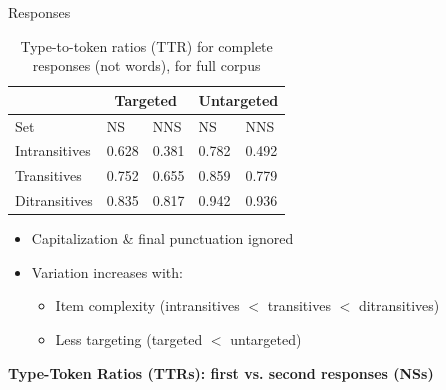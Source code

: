 \documentclass[final,t]{beamer}
\begin{document}
\begin{frame}{}
\begin{columns}[t]
\begin{column}{.33\linewidth}
\begin{block}{Responses}
\begin{center}
\begin{minipage}{.85\textwidth}
\begin{table}[h!]
\begin{center}
\begin{tabular}{|l||l|l||l|l|}
\hline
 & \multicolumn{2}{|c||}{Targeted} & \multicolumn{2}{|c|}{Untargeted} \\
\hline
 Set & NS & NNS & NS & NNS \\
\hline
\hline
Intransitives & 0.628 & 0.381 & 0.782 & 0.492 \\
\hline
Transitives & 0.752 & 0.655 & 0.859 & 0.779 \\
\hline
Ditransitives & 0.835 & 0.817 & 0.942 & 0.936 \\ 
\hline
\end{tabular}
\caption{\label{tab:ttr} Type-to-token ratios (TTR) for complete responses (not words), for full corpus}
\end{center}
\end{table}

\begin{itemize}
\item Capitalization \& final punctuation ignored
\item Variation increases with:
  \begin{itemize}
  \item Item complexity (intransitives $<$ transitives $<$ ditransitives) 
  \item Less targeting (targeted $<$ untargeted)
  \end{itemize}
\end{itemize}
\vspace{1em}


\begin{center}
  \textbf{Type-Token Ratios (TTRs): first vs. second responses (NSs)}
\end{center}


\end{minipage}
\end{center}
\end{block}
\end{column}
\end{columns}
\end{frame}
\end{document}
